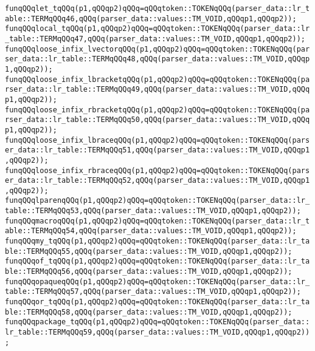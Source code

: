 \verb|funqQQqlet_tqQQq(p1,qQQqp2)qQQq=qQQqtoken::TOKENqQQq(parser_data::lr_table::TERMqQQq46,qQQq(parser_data::values::TM_VOID,qQQqp1,qQQqp2));|\newline
\verb|funqQQqlocal_tqQQq(p1,qQQqp2)qQQq=qQQqtoken::TOKENqQQq(parser_data::lr_table::TERMqQQq47,qQQq(parser_data::values::TM_VOID,qQQqp1,qQQqp2));|\newline
\verb|funqQQqloose_infix_lvectorqQQq(p1,qQQqp2)qQQq=qQQqtoken::TOKENqQQq(parser_data::lr_table::TERMqQQq48,qQQq(parser_data::values::TM_VOID,qQQqp1,qQQqp2));|\newline
\verb|funqQQqloose_infix_lbracketqQQq(p1,qQQqp2)qQQq=qQQqtoken::TOKENqQQq(parser_data::lr_table::TERMqQQq49,qQQq(parser_data::values::TM_VOID,qQQqp1,qQQqp2));|\newline
\verb|funqQQqloose_infix_rbracketqQQq(p1,qQQqp2)qQQq=qQQqtoken::TOKENqQQq(parser_data::lr_table::TERMqQQq50,qQQq(parser_data::values::TM_VOID,qQQqp1,qQQqp2));|\newline
\verb|funqQQqloose_infix_lbraceqQQq(p1,qQQqp2)qQQq=qQQqtoken::TOKENqQQq(parser_data::lr_table::TERMqQQq51,qQQq(parser_data::values::TM_VOID,qQQqp1,qQQqp2));|\newline
\verb|funqQQqloose_infix_rbraceqQQq(p1,qQQqp2)qQQq=qQQqtoken::TOKENqQQq(parser_data::lr_table::TERMqQQq52,qQQq(parser_data::values::TM_VOID,qQQqp1,qQQqp2));|\newline
\verb|funqQQqlparenqQQq(p1,qQQqp2)qQQq=qQQqtoken::TOKENqQQq(parser_data::lr_table::TERMqQQq53,qQQq(parser_data::values::TM_VOID,qQQqp1,qQQqp2));|\newline
\verb|funqQQqmacroqQQq(p1,qQQqp2)qQQq=qQQqtoken::TOKENqQQq(parser_data::lr_table::TERMqQQq54,qQQq(parser_data::values::TM_VOID,qQQqp1,qQQqp2));|\newline
\verb|funqQQqmy_tqQQq(p1,qQQqp2)qQQq=qQQqtoken::TOKENqQQq(parser_data::lr_table::TERMqQQq55,qQQq(parser_data::values::TM_VOID,qQQqp1,qQQqp2));|\newline
\verb|funqQQqof_tqQQq(p1,qQQqp2)qQQq=qQQqtoken::TOKENqQQq(parser_data::lr_table::TERMqQQq56,qQQq(parser_data::values::TM_VOID,qQQqp1,qQQqp2));|\newline
\verb|funqQQqopaqueqQQq(p1,qQQqp2)qQQq=qQQqtoken::TOKENqQQq(parser_data::lr_table::TERMqQQq57,qQQq(parser_data::values::TM_VOID,qQQqp1,qQQqp2));|\newline
\verb|funqQQqor_tqQQq(p1,qQQqp2)qQQq=qQQqtoken::TOKENqQQq(parser_data::lr_table::TERMqQQq58,qQQq(parser_data::values::TM_VOID,qQQqp1,qQQqp2));|\newline
\verb|funqQQqpackage_tqQQq(p1,qQQqp2)qQQq=qQQqtoken::TOKENqQQq(parser_data::lr_table::TERMqQQq59,qQQq(parser_data::values::TM_VOID,qQQqp1,qQQqp2));|\newline
